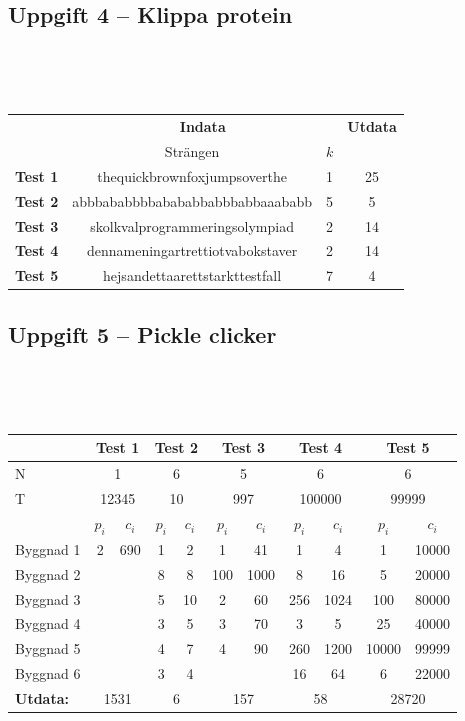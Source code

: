 \documentclass[a4paper,12pt,oneside]{amsbook}
\theoremstyle{test}
\newcommand{\fe}[1]{\textbf{#1}}            %
\begin{document}
\subsection*{Uppgift 4 -- Klippa protein}
~\\
{\tt 
\begin{tabular}{||l||c|c||c||}\hline\hline
& \multicolumn{2}{c||}{\fe{Indata}} & \multicolumn{1}{c||}{\fe{Utdata}} \\ 
& Strängen & $k$ &  \\ \hline \hline
\fe{Test 1} & thequickbrownfoxjumpsoverthe &1&25\\ \hline
\fe{Test 2} & abbbababbbbabababbabbbabbaaababb &5&5 \\ \hline
\fe{Test 3} & skolkvalprogrammeringsolympiad &2&14 \\ \hline
\fe{Test 4} & dennameningartrettiotvabokstaver &2&14 \\ \hline
\fe{Test 5} & hejsandettaarettstarkttestfall &7&4\\ \hline\hline
\end{tabular}
}
\vspace{1cm}

\newpage
\subsection*{Uppgift 5 -- Pickle clicker}
~\\
{\tt 
\begin{tabular}{||l||c|c||c|c||c|c||c|c||c|c||}\hline\hline
& \multicolumn{2}{c||}{\fe{Test 1}} & \multicolumn{2}{c||}{\fe{Test 2}}& \multicolumn{2}{c||}{\fe{Test 3}} & \multicolumn{2}{c||}{\fe{Test 4}} & \multicolumn{2}{c||}{\fe{Test 5}} \\\hline\hline
N & \multicolumn{2}{c||}{ 1 }& \multicolumn{2}{c||}{ 6} & \multicolumn{2}{c||}{ 5} & \multicolumn{2}{c||}{ 6}& \multicolumn{2}{c||}{ 6}\\ \hline
T & \multicolumn{2}{c||}{ 12345 }& \multicolumn{2}{c||}{ 10} & \multicolumn{2}{c||}{ 997} & \multicolumn{2}{c||}{ 100000}& \multicolumn{2}{c||}{ 99999}\\ \hline
& \fe{$p_i$} & \fe{$c_i$} & \fe{$p_i$} & \fe{$c_i$}& \fe{$p_i$} & \fe{$c_i$}& \fe{$p_i$} & \fe{$c_i$}& \fe{$p_i$} & \fe{$c_i$} \\ \hline
Byggnad 1	&	2	&	690	&	1	&	2	&	1	&	  41	  &	1	&	4	    &	1	    &	10000	\\
Byggnad 2	&	&	&	      8	&	8	&	100	&	1000	&	8	&	16	  &	5	    &	20000	\\
Byggnad 3	&	&	&	      5	&	10&	2	&	  60	 &	256	&	1024&	100   &	80000\\
Byggnad 4	&	&	&	      3	&	5	&	3	&	  70	 &	3	&	5	    &	25    &	40000\\
Byggnad 5	&	&	&	      4	&	7	&	4	&	  90	 &	260	& 1200&	10000 &	99999	\\
Byggnad 6	&	&	&	      3	&	4	& 	&		     &	16 &	64	&	6     &	22000 \\
\hline\hline
\fe{Utdata:} & \multicolumn{2}{c||}{ 1531 }& \multicolumn{2}{c||}{ 6} & \multicolumn{2}{c||}{ 157} & \multicolumn{2}{c||}{ 58}& \multicolumn{2}{c||}{ 28720} \\ \hline\hline
\end{tabular}
}
\vspace{1cm}
\end{document}
